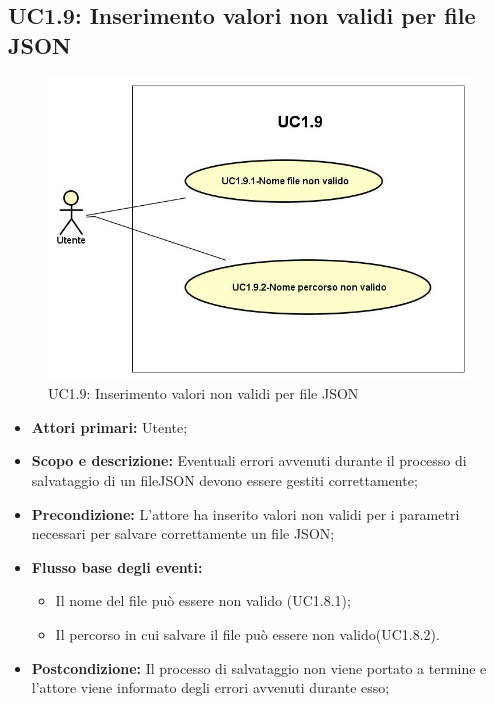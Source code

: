 \subsection{UC1.9: Inserimento valori non validi per file JSON} 
\begin{figure} [H]
	\centering
	\includegraphics[scale=0.45]{Img/UC1-9} 
	\caption{UC1.9: Inserimento valori non validi per file JSON} \label{} 
\end{figure} 
\begin{itemize} 
	\item{\textbf{Attori primari:} Utente;} 
	\item{\textbf{Scopo e descrizione:} Eventuali errori avvenuti durante il processo di salvataggio di un fileJSON devono essere gestiti correttamente;} 
	\item{\textbf{Precondizione:} L'attore ha inserito valori non validi per i parametri necessari per salvare correttamente un file JSON;} 
	\item{\textbf{Flusso base degli eventi:} } 
	\begin{itemize} 
		\item{Il nome del file può essere non valido (UC1.8.1);} 
		\item{Il percorso in cui salvare il file può essere non valido(UC1.8.2).} 
	\end{itemize} 
	\item{\textbf{Postcondizione:} Il processo di salvataggio non viene portato a termine e l'attore viene informato degli errori avvenuti durante esso;} 
\end{itemize} 

